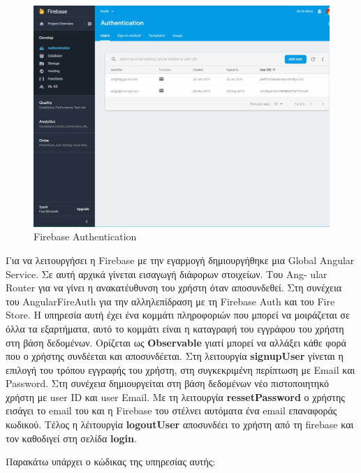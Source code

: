 \documentclass[a4paper,12pt]{article}
\begin{document}
			\begin{figure}[!htb]
				\begin{center}
					\caption{Firebase Authentication}
					\vspace*{0.5cm}

					\includegraphics[width=0.9\linewidth]{firebaseNo1} 
				\end{center}
			\end{figure}

			\newpage
			Για να λειτουργήσει η Firebase με την εγαρμογή δημιουργήθηκε μια Global\newline
			Angular Service. Σε αυτή αρχικά γίνεται εισαγωγή διάφορων στοιχείων.  
			Του Ang-
			ular Router για να γίνει η ανακατέυθυνση
			του χρήστη όταν αποσυνδεθεί. Στη συνέχεια του AngularFireAuth για την αλληλεπίδραση με τη Firebase Auth και του Fire Store. Η υπηρεσία αυτή έχει ένα κομμάτι
			πληροφοριών που μπορεί να μοιράζεται σε όλλα τα εξαρτήματα, αυτό το κομμάτι είναι η καταγραφή του εγγράφου του χρήστη στη βάση δεδομένων. Ορίζεται ως  \textbf{Observable} γιατί
			μπορεί να αλλάξει κάθε φορά που ο χρήστης συνδέεται και αποσυνδέεται. Στη λειτουργία \textbf{signupUser} γίνεται η επιλογή του τρόπου εγγραφής του χρήστη, στη συγκεκριμένη 
			περίπτωση με Email και Password. Στη συνέχεια δημιουργείται στη βάση δεδομένων νέο πιστοποιητηκό χρήστη με user ID και user Email. Με τη λειτουργία 
			\textbf{ressetPassword} ο χρήστης εισάγει το email του και η Firebase του στέλνει αυτόματα ένα email επαναφοράς κωδικού. Τέλος η λέιτουργία \textbf{logoutUser} αποσυνδέει το χρήστη από
			τη firebase και τον καθοδιγεί στη σελίδα \textbf{login}.

			Παρακάτω υπάρχει ο κώδικας της υπηρεσίας αυτής:
\end{document}
